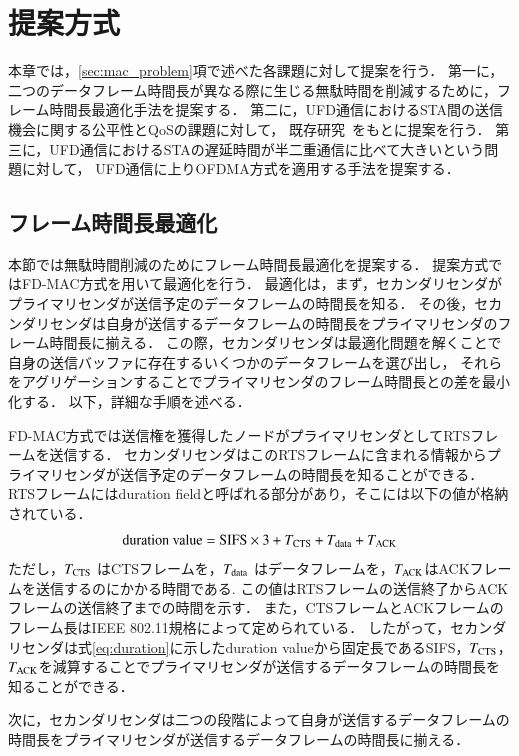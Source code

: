 \documentclass[master]{kuisthesis}		%
\begin{document}
\section{提案方式}
	本章では，\ref{sec:mac_problem}項で述べた各課題に対して提案を行う．
	第一に，二つのデータフレーム時間長が異なる際に生じる無駄時間を削減するために，フレーム時間長最適化手法を提案する．
	第二に，UFD通信におけるSTA間の送信機会に関する公平性とQoSの課題に対して，
	既存研究~\cite{promac}をもとに提案を行う．
	第三に，UFD通信におけるSTAの遅延時間が半二重通信に比べて大きいという問題に対して，
	UFD通信に上りOFDMA方式を適用する手法を提案する．
	\subsection{フレーム時間長最適化}\label{sec:frame_opt}
		本節では無駄時間削減のためにフレーム時間長最適化を提案する．
		提案方式ではFD-MAC方式\cite{fdmac}を用いて最適化を行う．
		最適化は，まず，セカンダリセンダがプライマリセンダが送信予定のデータフレームの時間長を知る．
		その後，セカンダリセンダは自身が送信するデータフレームの時間長をプライマリセンダのフレーム時間長に揃える．
		この際，セカンダリセンダは最適化問題を解くことで自身の送信バッファに存在するいくつかのデータフレームを選び出し，
		それらをアグリゲーションすることでプライマリセンダのフレーム時間長との差を最小化する．
		以下，詳細な手順を述べる．
		\par
		FD-MAC方式では送信権を獲得したノードがプライマリセンダとしてRTSフレームを送信する．
		セカンダリセンダはこのRTSフレームに含まれる情報からプライマリセンダが送信予定のデータフレームの時間長を知ることができる．
		RTSフレームにはduration fieldと呼ばれる部分があり，そこには以下の値が格納されている．
		\begin{equation}
			{\rm duration\ value} = {\rm SIFS} \times 3 + T_{{\rm CTS}} + T_{{\rm data}} + T_{{\rm ACK}} \label{eq:duration}
		\end{equation}
		ただし，$T_{\rm CTS}$ はCTSフレームを，$T_{\rm data}$ はデータフレームを，$T_{\rm ACK}$はACKフレームを送信するのにかかる時間である.
		この値はRTSフレームの送信終了からACKフレームの送信終了までの時間を示す．
		また，CTSフレームとACKフレームのフレーム長はIEEE 802.11規格によって定められている．
		したがって，セカンダリセンダは式\eqref{eq:duration}に示したduration valueから固定長であるSIFS，$T_{\rm CTS}$，$T_{\rm ACK}$を減算することでプライマリセンダが送信するデータフレームの時間長を知ることができる．
		\par
		次に，セカンダリセンダは二つの段階によって自身が送信するデータフレームの時間長をプライマリセンダが送信するデータフレームの時間長に揃える．
\end{document}
